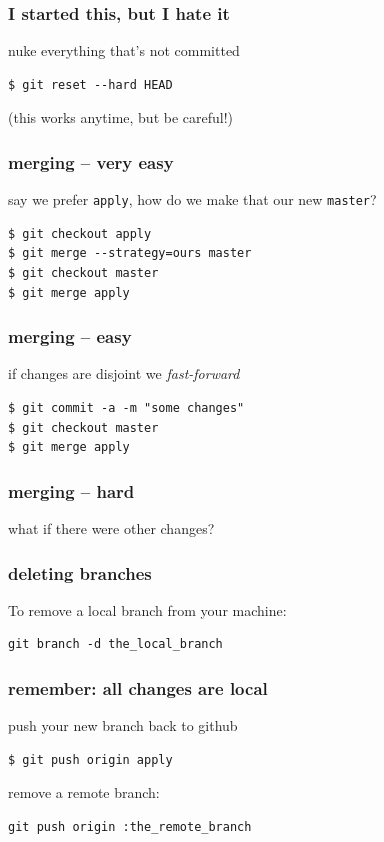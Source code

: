\documentclass[ignorenonframetext,]{beamer}
\begin{document}
\begin{frame}[fragile]\frametitle{I started this, but I hate it}

nuke everything that's not committed

\begin{verbatim}
$ git reset --hard HEAD
\end{verbatim}

(this works anytime, but be careful!)

\end{frame}

\begin{frame}[fragile]\frametitle{merging -- very easy}

say we prefer \texttt{apply}, how do we make that our new
\texttt{master}?

\begin{verbatim}
$ git checkout apply
$ git merge --strategy=ours master
$ git checkout master
$ git merge apply
\end{verbatim}

\end{frame}

\begin{frame}[fragile]\frametitle{merging -- easy}

if changes are disjoint we \emph{fast-forward}

\begin{verbatim}
$ git commit -a -m "some changes"
$ git checkout master
$ git merge apply
\end{verbatim}

\end{frame}

\begin{frame}\frametitle{merging -- hard}

what if there were other changes?

\end{frame}

\begin{frame}[fragile]\frametitle{deleting branches}

To remove a local branch from your machine:

\begin{verbatim}
git branch -d the_local_branch
\end{verbatim}

\end{frame}

\begin{frame}[fragile]\frametitle{remember: all changes are local}

push your new branch back to github

\begin{verbatim}
$ git push origin apply
\end{verbatim}

remove a remote branch:

\begin{verbatim}
git push origin :the_remote_branch
\end{verbatim}

\end{frame}
\end{document}
